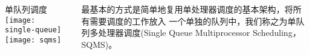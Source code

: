 \begin{frame}
	\begin{columns}
	\begin{column}{.5\textwidth}
	\Large \centering
	单队列调度
    \texttt{[image: single-queue]}
	\texttt{[image: sqms]}	
	\end{column}
	
	\begin{column}{.5\textwidth}
		\large
		最基本的方式是简单地复用单处理器调度的基本架构，将所有需要调度的工作放入 一个单独的队列中，我们称之为单队列多处理器调度(Single Queue Multiprocessor Scheduling，SQMS)。

		
	\end{column}
\end{columns}
\end{frame}












